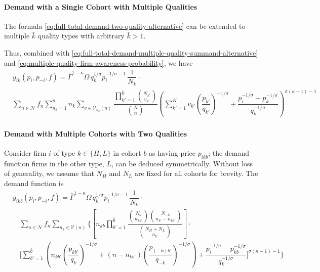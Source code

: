 \documentclass[12pt]{article}
\begin{document}
\paragraph{Demand with a Single Cohort with Multiple Qualities}
The formula \eqref{eq:full-total-demand-two-quality-alternative} can be extended to multiple ${\bar k}$ quality types with arbitrary ${\bar k} > 1$. 

Thus, combined with \eqref{eq:full-total-demand-multiple-quality-summand-alternative} and \eqref{eq:multiple-quality-firm-awareness-probability}, we have
\begin{align}
& y_{ik}(p_i, p_{-i}, f) 
=  \bar{\Gamma}^{1-\kappa}\Omega \, q_k^{1/\sigma}p_i^{-1/\sigma - 1}\, \dfrac{1}{N_k} \cdot \\ 
&\sum_{n \in \mathcal{N} } f_n   \sum_{n_k =1}^n  
n_k \sum_{v \in \mathcal{V}_{n_k} (n)} 
\dfrac{\prod_{k'=1}^{\bar k} \binom{ N_{k'} }{ v_{k'} } }{\binom{N}{n}}
\left( 
\sum_{k' =1 }^{K} v_{k'} \left( \dfrac{p_{k'}}{q_{k'}}  \right)^{-1/\sigma} +   
\dfrac{p_i^{-1/\sigma}   - p^{-1/\sigma}_{k} }{{ q_k^{-1/\sigma }}}
\right)^{\sigma (\kappa - 1)-1}
\end{align}

\paragraph{Demand with Multiple Cohorts with Two Qualities}
Consider firm $i$ of type $k \in \{H, L\}$ in cohort $b$ as having price $p_{ikb}$; the demand function firms in the other type, $L$, can be deduced symmetrically. Without loss of generality, we assume that $N_H$ and $N_L$ are fixed for all cohorts for brevity. The demand function is
\begin{equation}\label{eq:full-total-demand-two-quality-multiple-cohort-alternative}
\begin{aligned}
& y_{ikb}(p_i, p_{-i}, f) 
=  \bar{\Gamma}^{1-\kappa}\Omega \, q_k^{1/\sigma}p_i^{-1/\sigma - 1}\, \dfrac{1}{N_k} \cdot  \\ 
& \quad \sum_{n \in \mathcal{N} } f_n   \sum_{n_k \in \mathcal{V} (n) }  
\Bigg\{
\left[ n_{kb} \prod_{b'=1}^{\bar b} 
 \dfrac{\binom{N_k}{n_{kb'}} \binom{N_{-k}}{n_{b'} - n_{kb'}}}{\binom{N_H + N_L}{n_{b'}}}
\right] \cdot \\ & \quad
\Bigg[
\sum_{b' = 1}^{\bar b} 
\left(
n_{kb'} \left( \dfrac{p_{kb'}}{q_{k}}   \right)^{-1/\sigma} +  
(n - n_{kb'}) \left( \dfrac{p_{(-k)b'}}{q_{-k}}   \right)^{-1/\sigma} \right) + 
\dfrac{p_i^{-1/\sigma} - p^{-1/\sigma}_{kb} }{ q_k^{-1/\sigma }} 
\Bigg]^{\sigma (\kappa - 1)-1} \Bigg\}
\end{aligned}
\end{equation}
\end{document}
